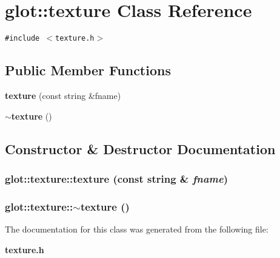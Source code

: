 \section{glot::texture Class Reference}
\label{classglot_1_1texture}
{\tt \#include $<$texture.h$>$}

\subsection*{Public Member Functions}
\begin{CompactItemize}
\item 
{\bf texture} (const string \&fname)
\item 
{\bf $\sim$texture} ()
\end{CompactItemize}


\subsection{Constructor \& Destructor Documentation}
\subsubsection[{texture}]{\setlength{\rightskip}{0pt plus 5cm}glot::texture::texture (const string \& {\em fname})\hspace{0.3cm}{\tt  [inline]}}\label{classglot_1_1texture_b4f48efa54bbab9e2838a310efd14a93}


\subsubsection[{$\sim$texture}]{\setlength{\rightskip}{0pt plus 5cm}glot::texture::$\sim$texture ()\hspace{0.3cm}{\tt  [inline]}}\label{classglot_1_1texture_fdb9ffb11d5d7eb19914c9bde92727f8}




The documentation for this class was generated from the following file:\begin{CompactItemize}
\item 
{\bf texture.h}\end{CompactItemize}
